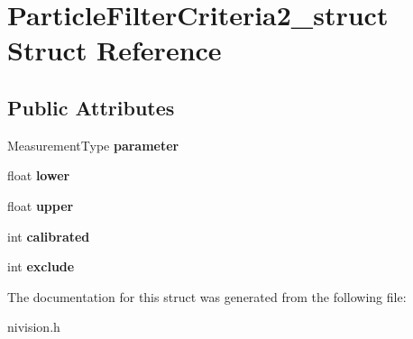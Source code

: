 \hypertarget{structParticleFilterCriteria2__struct}{
\section{ParticleFilterCriteria2\_\-struct Struct Reference}
\label{structParticleFilterCriteria2__struct}
}
\subsection*{Public Attributes}
\begin{DoxyCompactItemize}
\item 
\hypertarget{structParticleFilterCriteria2__struct_a92f1ffea23930a8b58c64f48f4dd62d4}{
MeasurementType {\bfseries parameter}}
\label{structParticleFilterCriteria2__struct_a92f1ffea23930a8b58c64f48f4dd62d4}

\item 
\hypertarget{structParticleFilterCriteria2__struct_a55eb00e3c3928286c84cd1cbc439aa3f}{
float {\bfseries lower}}
\label{structParticleFilterCriteria2__struct_a55eb00e3c3928286c84cd1cbc439aa3f}

\item 
\hypertarget{structParticleFilterCriteria2__struct_ab15ec805f01adb1a0a02404d6ea9dfa1}{
float {\bfseries upper}}
\label{structParticleFilterCriteria2__struct_ab15ec805f01adb1a0a02404d6ea9dfa1}

\item 
\hypertarget{structParticleFilterCriteria2__struct_af5f73417974f564a17cca32f5f6ec6e0}{
int {\bfseries calibrated}}
\label{structParticleFilterCriteria2__struct_af5f73417974f564a17cca32f5f6ec6e0}

\item 
\hypertarget{structParticleFilterCriteria2__struct_a959bf3aa7d6787a582a4b5c835ceefcf}{
int {\bfseries exclude}}
\label{structParticleFilterCriteria2__struct_a959bf3aa7d6787a582a4b5c835ceefcf}

\end{DoxyCompactItemize}


The documentation for this struct was generated from the following file:\begin{DoxyCompactItemize}
\item 
nivision.h\end{DoxyCompactItemize}
